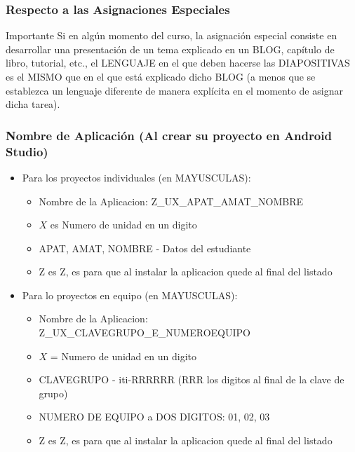 \begin{frame}
\frametitle{Respecto a las Asignaciones Especiales}

\begin{alertblock}{Importante}
Si en algún momento del curso, la asignación especial consiste en desarrollar una presentación de un tema explicado en un BLOG, capítulo de libro, tutorial, etc., el LENGUAJE en el que deben hacerse las DIAPOSITIVAS es el MISMO que en el que está explicado dicho BLOG (a menos que se establezca un lenguaje diferente de manera explícita en el momento de asignar dicha tarea).
\end{alertblock}



\end{frame}







\begin{frame}
\frametitle{Nombre de Aplicaci\'on (Al crear su proyecto en Android Studio)}
\begin{itemize}
\item Para los proyectos individuales (en MAYUSCULAS):
\begin{itemize}
\item Nombre de la Aplicacion: Z\_UX\_APAT\_AMAT\_NOMBRE
\item $X$ es Numero de unidad en un digito
\item APAT, AMAT, NOMBRE - Datos del estudiante
\item Z es Z, es para que al instalar la aplicacion quede al final del listado
\end{itemize}
\item Para lo proyectos en equipo (en MAYUSCULAS):
\begin{itemize}
\item Nombre de la Aplicacion: Z\_UX\_CLAVEGRUPO\_E\_NUMEROEQUIPO
\item $X$ = Numero de unidad en un digito
\item CLAVEGRUPO - iti-RRRRRR (RRR los digitos al final de la clave de grupo)
\item NUMERO DE EQUIPO a DOS DIGITOS: 01, 02, 03
\item Z es Z, es para que al instalar la aplicacion  quede al final del listado
\end{itemize}
\end{itemize}

\end{frame}



